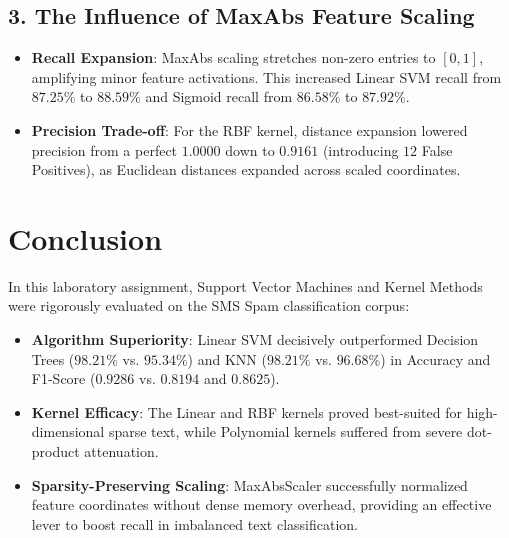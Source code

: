 \documentclass[12pt]{article}
\begin{document}
\subsection{3. The Influence of MaxAbs Feature Scaling}
\begin{itemize}
    \item \textbf{Recall Expansion}: MaxAbs scaling stretches non-zero entries to $[0, 1]$, amplifying minor feature activations. This increased Linear SVM recall from $87.25\%$ to $88.59\%$ and Sigmoid recall from $86.58\%$ to $87.92\%$.
    \item \textbf{Precision Trade-off}: For the RBF kernel, distance expansion lowered precision from a perfect $1.0000$ down to $0.9161$ (introducing $12$ False Positives), as Euclidean distances expanded across scaled coordinates.
\end{itemize}

\section{Conclusion}
In this laboratory assignment, Support Vector Machines and Kernel Methods were rigorously evaluated on the SMS Spam classification corpus:
\begin{itemize}
    \item \textbf{Algorithm Superiority}: Linear SVM decisively outperformed Decision Trees ($98.21\%$ vs. $95.34\%$) and KNN ($98.21\%$ vs. $96.68\%$) in Accuracy and F1-Score ($0.9286$ vs. $0.8194$ and $0.8625$).
    \item \textbf{Kernel Efficacy}: The Linear and RBF kernels proved best-suited for high-dimensional sparse text, while Polynomial kernels suffered from severe dot-product attenuation.
    \item \textbf{Sparsity-Preserving Scaling}: MaxAbsScaler successfully normalized feature coordinates without dense memory overhead, providing an effective lever to boost recall in imbalanced text classification.
\end{itemize}
\end{document}
